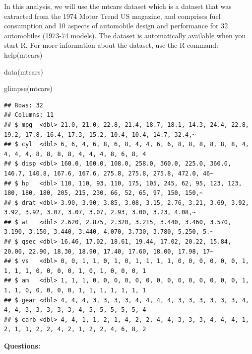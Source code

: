 \documentclass[
]{book}
\newenvironment{Shaded}{\begin{snugshade}}{\end{snugshade}}
\newcommand{\FunctionTok}[1]{\textcolor[rgb]{0.00,0.00,0.00}{#1}}
\newcommand{\NormalTok}[1]{#1}
\theoremstyle{definition}
\theoremstyle{definition}
\theoremstyle{definition}
\theoremstyle{definition}
\theoremstyle{remark}
\begin{document}
In this analysis, we will use the mtcars dataset which is a dataset that was extracted from the 1974 Motor Trend US magazine, and comprises fuel consumption and 10 aspects of automobile design and performance for 32 automobiles (1973-74 models). The dataset is automatically available when you start R. For more information about the dataset, use the R command: help(mtcars)

\begin{Shaded}
\begin{Highlighting}[]
\FunctionTok{data}\NormalTok{(mtcars)}

\FunctionTok{glimpse}\NormalTok{(mtcars)}
\end{Highlighting}
\end{Shaded}

\begin{verbatim}
## Rows: 32
## Columns: 11
## $ mpg  <dbl> 21.0, 21.0, 22.8, 21.4, 18.7, 18.1, 14.3, 24.4, 22.8, 19.2, 17.8, 16.4, 17.3, 15.2, 10.4, 10.4, 14.7, 32.4,~
## $ cyl  <dbl> 6, 6, 4, 6, 8, 6, 8, 4, 4, 6, 6, 8, 8, 8, 8, 8, 8, 4, 4, 4, 4, 8, 8, 8, 8, 4, 4, 4, 8, 6, 8, 4
## $ disp <dbl> 160.0, 160.0, 108.0, 258.0, 360.0, 225.0, 360.0, 146.7, 140.8, 167.6, 167.6, 275.8, 275.8, 275.8, 472.0, 46~
## $ hp   <dbl> 110, 110, 93, 110, 175, 105, 245, 62, 95, 123, 123, 180, 180, 180, 205, 215, 230, 66, 52, 65, 97, 150, 150,~
## $ drat <dbl> 3.90, 3.90, 3.85, 3.08, 3.15, 2.76, 3.21, 3.69, 3.92, 3.92, 3.92, 3.07, 3.07, 3.07, 2.93, 3.00, 3.23, 4.08,~
## $ wt   <dbl> 2.620, 2.875, 2.320, 3.215, 3.440, 3.460, 3.570, 3.190, 3.150, 3.440, 3.440, 4.070, 3.730, 3.780, 5.250, 5.~
## $ qsec <dbl> 16.46, 17.02, 18.61, 19.44, 17.02, 20.22, 15.84, 20.00, 22.90, 18.30, 18.90, 17.40, 17.60, 18.00, 17.98, 17~
## $ vs   <dbl> 0, 0, 1, 1, 0, 1, 0, 1, 1, 1, 1, 0, 0, 0, 0, 0, 0, 1, 1, 1, 1, 0, 0, 0, 0, 1, 0, 1, 0, 0, 0, 1
## $ am   <dbl> 1, 1, 1, 0, 0, 0, 0, 0, 0, 0, 0, 0, 0, 0, 0, 0, 0, 1, 1, 1, 0, 0, 0, 0, 0, 1, 1, 1, 1, 1, 1, 1
## $ gear <dbl> 4, 4, 4, 3, 3, 3, 3, 4, 4, 4, 4, 3, 3, 3, 3, 3, 3, 4, 4, 4, 3, 3, 3, 3, 3, 4, 5, 5, 5, 5, 5, 4
## $ carb <dbl> 4, 4, 1, 1, 2, 1, 4, 2, 2, 4, 4, 3, 3, 3, 4, 4, 4, 1, 2, 1, 1, 2, 2, 4, 2, 1, 2, 2, 4, 6, 8, 2
\end{verbatim}

\textbf{Questions:}
\end{document}
